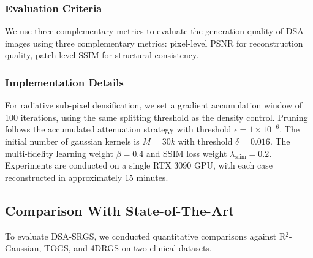 \documentclass[runningheads]{llncs}
\begin{document}
\subsubsection{Evaluation Criteria}We use three complementary metrics to evaluate the generation quality of DSA images using three complementary metrics: pixel-level PSNR for reconstruction quality, patch-level SSIM\cite{wang2004image} for structural consistency.

\subsubsection{Implementation Details}For radiative sub-pixel densification, we set a gradient accumulation window of 100 iterations, using the same splitting threshold as the density control. Pruning follows the accumulated attenuation strategy with threshold \(\epsilon=1\times10^{-6}\). The initial number of gaussian kernels is \(M=30k\) with threshold \(\delta=0.016\). The multi-fidelity learning weight \(\beta=0.4\) and SSIM loss weight \(\lambda_{\text{ssim}}=0.2\). Experiments are conducted on a single RTX 3090 GPU, with each case reconstructed in approximately 15 minutes.



\subsection{Comparison With State-of-The-Art}%
To evaluate DSA-SRGS, we conducted quantitative comparisons against R$^2$-Gaussian, TOGS, and 4DRGS on two clinical datasets. 
\end{document}
